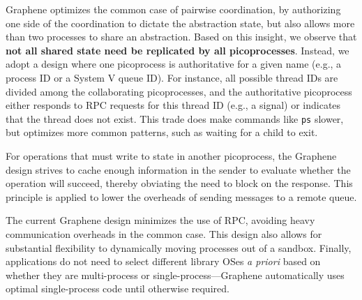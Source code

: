 \vspace{5pt}
Graphene optimizes the common case of pairwise coordination,
by authorizing one side of the coordination to dictate the abstraction state,
but also allows
more than two processes to share an abstraction.
Based on this insight, 
we observe that {\bf not all shared state need be replicated by all picoprocesses}.
Instead, we adopt a design where one picoprocess is authoritative for a given name (e.g., a process ID or a System V queue ID).
For instance, all possible thread IDs are divided among the collaborating picoprocesses,
and the authoritative picoprocess either responds to RPC requests for this thread ID (e.g., a signal)
or indicates that the thread does not exist.
This trade does make commands like {\tt ps} slower, 
but optimizes more common patterns, such as waiting for a child to exit.

\vspace{5pt}
For operations that must write to state in another picoprocess, 
the Graphene design strives to cache enough information in the sender 
to evaluate whether the operation will succeed, thereby obviating the 
need to block on the response.  This principle is applied to lower the overheads
of sending messages to a remote queue.




\vspace{5pt}
The current Graphene design minimizes the use of RPC,
avoiding heavy communication overheads in the common case.
This design also allows for substantial flexibility to dynamically moving processes out of
a sandbox.  Finally, applications do not need to select different 
library OSes {\em a priori} based on whether they are multi-process or single-process---Graphene
automatically uses optimal single-process code until otherwise required.
